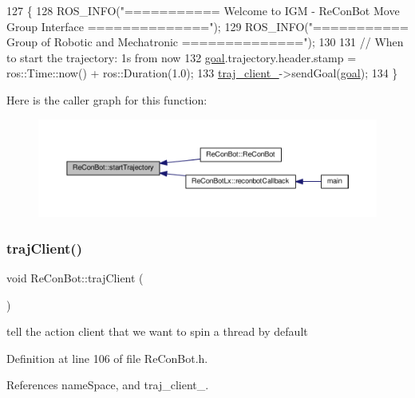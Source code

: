 \begin{DoxyCode}
127                                                                         \{
128   ROS\_INFO(\textcolor{stringliteral}{"=========== Welcome to IGM - ReConBot Move Group Interface =============="});
129   ROS\_INFO(\textcolor{stringliteral}{"=========== Group of Robotic and Mechatronic               =============="});
130 
131     \textcolor{comment}{// When to start the trajectory: 1s from now}
132     \hyperlink{class_re_con_bot_a9bd1c7ddf2376e2e68ea5d8bd8c3f505}{goal}.trajectory.header.stamp = ros::Time::now() + ros::Duration(1.0);
133     \hyperlink{class_re_con_bot_a14a35ad6ca284af7db7228d7872720d1}{traj\_client\_}->sendGoal(\hyperlink{class_re_con_bot_a9bd1c7ddf2376e2e68ea5d8bd8c3f505}{goal});
134   \}
\end{DoxyCode}
Here is the caller graph for this function\+:
\nopagebreak
\begin{figure}[H]
\begin{center}
\leavevmode
\includegraphics[width=350pt]{d9/d0b/class_re_con_bot_ade3eb1a4752d45659321209f5730cef3_icgraph}
\end{center}
\end{figure}
\mbox{\label{class_re_con_bot_ab859fa96532995d3c1545aaa9db1802e}} 
\subsubsection{\texorpdfstring{traj\+Client()}{trajClient()}}
{\footnotesize\ttfamily void Re\+Con\+Bot\+::traj\+Client (\begin{DoxyParamCaption}{ }\end{DoxyParamCaption})}

tell the action client that we want to spin a thread by default

Definition at line 106 of file Re\+Con\+Bot.\+h.



References name\+Space, and traj\+\_\+client\+\_\+.




